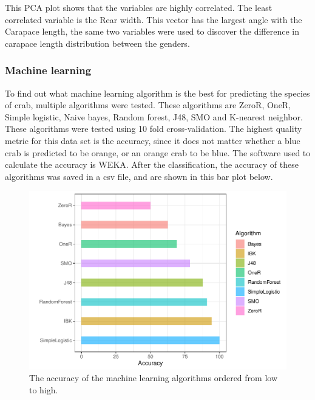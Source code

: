 \documentclass[
]{article}
\begin{document}
This PCA plot shows that the variables are highly correlated. The least
correlated variable is the Rear width. This vector has the largest angle
with the Carapace length, the same two variables were used to discover
the difference in carapace length distribution between the genders.

\hypertarget{machine-learning}{%
\subsubsection{Machine learning}\label{machine-learning}}

To find out what machine learning algorithm is the best for predicting
the species of crab, multiple algorithms were tested. These algorithms
are ZeroR, OneR, Simple logistic, Naive bayes, Random forest, J48, SMO
and K-nearest neighbor. These algorithms were tested using 10 fold
cross-validation. The highest quality metric for this data set is the
accuracy, since it does not matter whether a blue crab is predicted to
be orange, or an orange crab to be blue. The software used to calculate
the accuracy is WEKA. After the classification, the accuracy of these
algorithms was saved in a csv file, and are shown in this bar plot
below.

\begin{figure}[H]

{\centering \includegraphics{CrabProject_files/figure-latex/ml-1} 

}

\caption{The accuracy of the machine learning algorithms ordered from low to high.}\label{fig:ml}
\end{figure}
\end{document}
